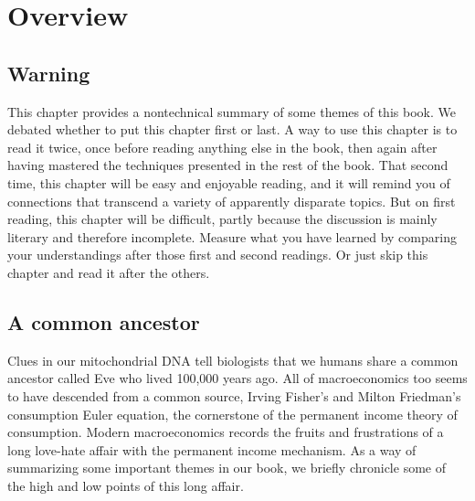 \chapter{Overview\label{overview}}%


\section{Warning}

This chapter provides a nontechnical summary of some themes of
this book.
We debated whether to put this chapter first or last.  A way to use this
chapter is to read it twice, once before reading anything else in the book,
then again after having mastered the techniques presented  in the rest of the book.
That second time, this chapter will be easy and enjoyable reading,
and it will remind you of connections that transcend a variety of apparently disparate
topics.  But on first reading, this chapter will be difficult, partly because
the discussion is mainly literary and therefore incomplete.  Measure
what you have learned by comparing your understandings after those first
and second readings.  Or just skip this chapter and read it after
the others.

\section{A common ancestor}

Clues in our mitochondrial DNA tell  biologists that we  humans
share a common ancestor called Eve who lived 100,000 years ago.
All of macroeconomics too seems to have descended from a
common source, Irving Fisher's and Milton Friedman's
 consumption Euler
equation, the cornerstone of
 the permanent income theory of consumption.
Modern macroeconomics records the fruits and frustrations of a long
love-hate affair with the permanent income mechanism. As a way of
summarizing some important themes in our book, we briefly
chronicle some  of the high and low points of this long affair.


